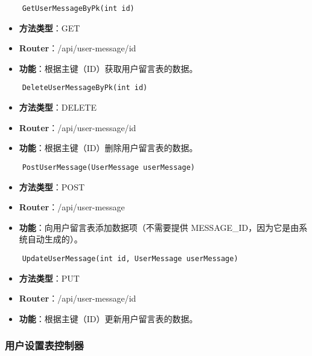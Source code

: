 \begin{verbatim}
	GetUserMessageByPk(int id)
\end{verbatim}

\begin{itemize}
	\item \textbf{方法类型}：GET
	\item \textbf{Router}：/api/user-message/{id}
	\item \textbf{功能}：根据主键（ID）获取用户留言表的数据。
\end{itemize}

\begin{verbatim}
	DeleteUserMessageByPk(int id)
\end{verbatim}

\begin{itemize}
	\item \textbf{方法类型}：DELETE
	\item \textbf{Router}：/api/user-message/{id}
	\item \textbf{功能}：根据主键（ID）删除用户留言表的数据。
\end{itemize}

\begin{verbatim}
	PostUserMessage(UserMessage userMessage)
\end{verbatim}

\begin{itemize}
	\item \textbf{方法类型}：POST
	\item \textbf{Router}：/api/user-message
	\item \textbf{功能}：向用户留言表添加数据项（不需要提供 MESSAGE\_ID，因为它是由系统自动生成的）。
\end{itemize}

\begin{verbatim}
	UpdateUserMessage(int id, UserMessage userMessage)
\end{verbatim}

\begin{itemize}
	\item \textbf{方法类型}：PUT
	\item \textbf{Router}：/api/user-message/{id}
	\item \textbf{功能}：根据主键（ID）更新用户留言表的数据。
\end{itemize}

\subsubsection{用户设置表控制器}

